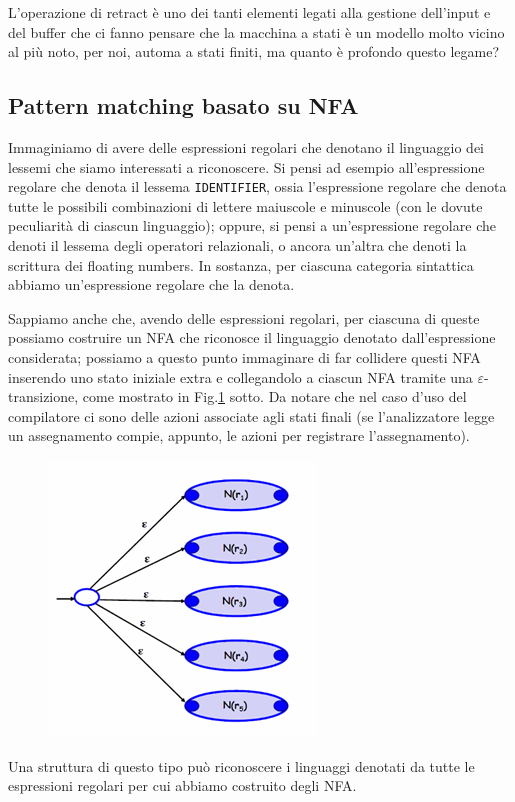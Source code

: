 \documentclass[class=book, crop=false, oneside, 12pt]{standalone}
\begin{document}
L'operazione di retract è uno dei tanti elementi legati alla gestione dell'input e del buffer che ci fanno pensare che la macchina a stati è un modello molto vicino al più noto, per noi, automa a stati finiti, ma quanto è profondo questo legame?

\subsection{Pattern matching basato su NFA}
Immaginiamo di avere delle espressioni regolari che denotano il linguaggio dei lessemi che siamo interessati a riconoscere. Si pensi ad esempio all'espressione regolare che denota il lessema \texttt{IDENTIFIER}, ossia l'espressione regolare che denota tutte le possibili combinazioni di lettere maiuscole e minuscole (con le dovute peculiarità di ciascun linguaggio); oppure, si pensi a un'espressione regolare che denoti il lessema degli operatori relazionali, o ancora un'altra che denoti la scrittura dei floating numbers. In sostanza, per ciascuna categoria sintattica abbiamo un'espressione regolare che la denota.

Sappiamo anche che, avendo delle espressioni regolari, per ciascuna di queste possiamo costruire un NFA che riconosce il linguaggio denotato dall'espressione considerata; possiamo a questo punto immaginare di far collidere questi NFA inserendo uno stato iniziale extra e collegandolo a ciascun NFA tramite una \(\varepsilon\)-transizione, come mostrato in Fig.\ref{nfa_for_grammar_regular_expressions} sotto.
Da notare che nel caso d'uso del compilatore ci sono delle azioni associate agli stati finali (se l'analizzatore legge un assegnamento compie, appunto, le azioni per registrare l'assegnamento).
\begin{figure}[H]
    \centering
    \includegraphics[width=.4\textwidth,keepaspectratio]{lec-14-2}
    \caption{}
    \label{nfa_for_grammar_regular_expressions}
\end{figure}
Una struttura di questo tipo può riconoscere i linguaggi denotati da tutte le espressioni regolari per cui abbiamo costruito degli NFA. 
\end{document}
